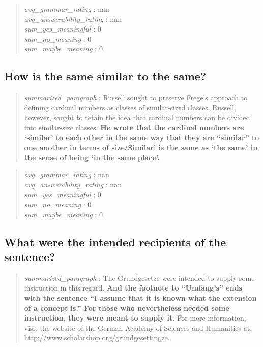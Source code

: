 \begin{quote}
\emph{avg\_grammar\_rating} : nan\\
\emph{avg\_answerability\_rating} : nan\\
\emph{sum\_yes\_meaningful} : 0\\
\emph{sum\_no\_meaning} : 0\\
\emph{sum\_maybe\_meaning} : 0
\end{quote}

\hypertarget{how-is-the-same-similar-to-the-same}{%
\subsection{How is the same similar to the
same?}\label{how-is-the-same-similar-to-the-same}}

\begin{quote}
\emph{summarized\_paragraph} : Russell sought to preserve Frege's
approach to defining cardinal numbers as classes of similar-sized
classes. Russell, however, sought to retain the idea that cardinal
numbers can be divided into similar-size classes. \textbf{He wrote that
the cardinal numbers are `similar' to each other in the same way that
they are ``similar'' to one another in terms of size.`Similar' is the
same as `the same' in the sense of being `in the same place'.}
\end{quote}

\begin{quote}
\emph{avg\_grammar\_rating} : nan\\
\emph{avg\_answerability\_rating} : nan\\
\emph{sum\_yes\_meaningful} : 0\\
\emph{sum\_no\_meaning} : 0\\
\emph{sum\_maybe\_meaning} : 0
\end{quote}

\hypertarget{what-were-the-intended-recipients-of-the-sentence}{%
\subsection{What were the intended recipients of the
sentence?}\label{what-were-the-intended-recipients-of-the-sentence}}

\begin{quote}
\emph{summarized\_paragraph} : The Grundgesetze were intended to supply
some instruction in this regard. \textbf{And the footnote to
``Umfang's'' ends with the sentence ``I assume that it is known what the
extension of a concept is.'' For those who nevertheless needed some
instruction, they were meant to supply it.} For more information, visit
the website of the German Academy of Sciences and Humanities at:
http://www.scholarshop.org/grundgesettingze.
\end{quote}

